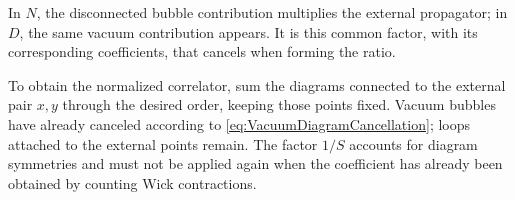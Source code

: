 \documentclass[11pt,letterpaper]{article}
\theoremstyle{definition}
\theoremstyle{definition}
\begin{document}
In $N$, the disconnected bubble contribution multiplies the external
propagator; in $D$, the same vacuum contribution appears.
It is this common factor, with its corresponding coefficients,
that cancels when forming the ratio.

To obtain the normalized correlator, sum the diagrams connected to the
external pair $x,y$ through the desired order, keeping those points fixed.
Vacuum bubbles have already canceled according to
\eqref{eq:VacuumDiagramCancellation}; loops attached to the external points
remain. The factor $1/S$ accounts for diagram symmetries and must not be
applied again when the coefficient has already been obtained by counting
Wick contractions.
\end{document}
